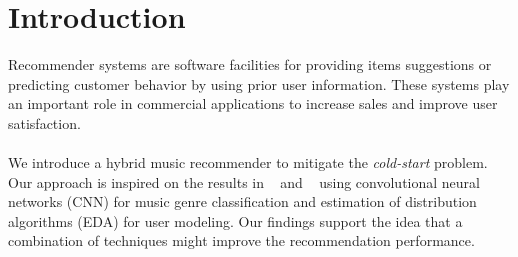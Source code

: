 
\section{Introduction}

Recommender systems are software facilities for providing items suggestions or predicting customer behavior by using prior user information. These systems play an important role in commercial applications to increase sales and improve user satisfaction.\\
\\
We introduce a hybrid music recommender to mitigate the \emph{cold-start} problem. Our approach is inspired on the results in ~\cite{DBLP:journals/corr/KereliukSL15} and ~\cite{Liang2014781} using convolutional neural networks (CNN) for music genre classification and estimation of distribution algorithms (EDA) for user modeling. Our findings support the idea that a combination of techniques might
improve the recommendation performance.
